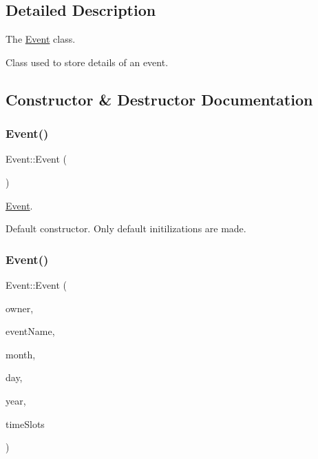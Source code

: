 \subsection{Detailed Description}
The \hyperlink{class_event}{Event} class. 

Class used to store details of an event. 

\subsection{Constructor \& Destructor Documentation}
\mbox{\label{class_event_a5a40dd4708297f7031e29b39e039ae10}} 
\subsubsection{\texorpdfstring{Event()}{Event()}\hspace{0.1cm}{\footnotesize\ttfamily [1/2]}}
{\footnotesize\ttfamily Event\+::\+Event (\begin{DoxyParamCaption}{ }\end{DoxyParamCaption})}



\hyperlink{class_event}{Event}. 

Default constructor. Only default initilizations are made. \mbox{\label{class_event_a28e7aab4f7a4f7bd375a63be18b5c44c}} 
\subsubsection{\texorpdfstring{Event()}{Event()}\hspace{0.1cm}{\footnotesize\ttfamily [2/2]}}
{\footnotesize\ttfamily Event\+::\+Event (\begin{DoxyParamCaption}\item[{Q\+String}]{owner,  }\item[{Q\+String}]{event\+Name,  }\item[{int}]{month,  }\item[{int}]{day,  }\item[{int}]{year,  }\item[{Q\+List$<$ \hyperlink{class_time_slot}{Time\+Slot} $>$}]{time\+Slots }\end{DoxyParamCaption})}



